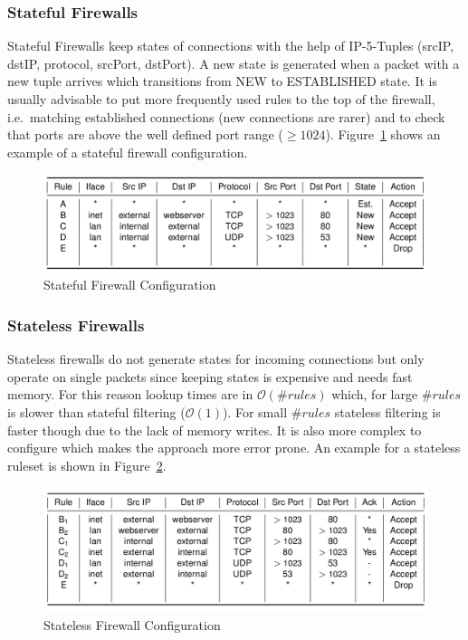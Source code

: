 \subsubsection*{Stateful Firewalls}
Stateful Firewalls keep states of connections with the help of IP-5-Tuples (srcIP, dstIP, protocol, srcPort, dstPort).
A new state is generated when a packet with a new tuple arrives which transitions from NEW to ESTABLISHED state.
It is usually advisable to put more frequently used rules to the top of the firewall, i.e.\ matching established connections (new connections are rarer) and to check that ports are above the well defined port range ($\geq 1024$).
Figure~\ref{fig:stateful_firewall} shows an example of a stateful firewall configuration.
\begin{figure}[h]
  \centering
  \includegraphics[width=.8\textwidth]{figures/stateful_firewall.png}
  \caption{Stateful Firewall Configuration}\label{fig:stateful_firewall}
\end{figure}

\subsubsection*{Stateless Firewalls}
Stateless firewalls do not generate states for incoming connections but only operate on single packets since keeping states is expensive and needs fast memory.
For this reason lookup times are in $\mathcal{O}(\#rules)$ which, for large $\#rules$ is slower than stateful filtering ($\mathcal{O}(1)$).
For small $\#rules$ stateless filtering is faster though due to the lack of memory writes.
It is also more complex to configure which makes the approach more error prone.
An example for a stateless ruleset is shown in Figure~\ref{fig:stateless_firewall}.
\begin{figure}[h]
  \centering
  \includegraphics[width=.8\textwidth]{figures/stateless_firewall.png}
  \caption{Stateless Firewall Configuration}\label{fig:stateless_firewall}
\end{figure}

